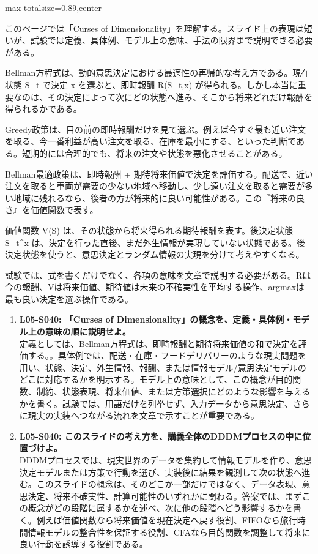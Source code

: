 \begin{minipage}[t]{0.58\textwidth}
\begin{adjustbox}{max totalsize={\textwidth}{0.89\textheight},center}
\begin{minipage}{\textwidth}\scriptsize
{}このページでは「Curses of Dimensionality」を理解する。スライド上の表現は短いが、試験では定義、具体例、モデル上の意味、手法の限界まで説明できる必要がある。\par
Bellman方程式は、動的意思決定における最適性の再帰的な考え方である。現在状態 S\_t で決定 x を選ぶと、即時報酬 R(S\_t,x) が得られる。しかし本当に重要なのは、その決定によって次にどの状態へ進み、そこから将来どれだけ報酬を得られるかである。\par
Greedy政策は、目の前の即時報酬だけを見て選ぶ。例えば今すぐ最も近い注文を取る、今一番利益が高い注文を取る、在庫を最小にする、といった判断である。短期的には合理的でも、将来の注文や状態を悪化させることがある。\par
Bellman最適政策は、即時報酬 + 期待将来価値で決定を評価する。配送で、近い注文を取ると車両が需要の少ない地域へ移動し、少し遠い注文を取ると需要が多い地域に残れるなら、後者の方が将来的に良い可能性がある。この『将来の良さ』を価値関数で表す。\par
価値関数 V(S) は、その状態から将来得られる期待報酬を表す。後決定状態 S\_t\textasciicircum{}x は、決定を行った直後、まだ外生情報が実現していない状態である。後決定状態を使うと、意思決定とランダム情報の実現を分けて考えやすくなる。\par
試験では、式を書くだけでなく、各項の意味を文章で説明する必要がある。Rは今の報酬、Vは将来価値、期待値は未来の不確実性を平均する操作、argmaxは最も良い決定を選ぶ操作である。\par{}\begin{enumerate}\item \textbf{L05-S040: 「Curses of Dimensionality」の概念を、定義・具体例・モデル上の意味の順に説明せよ。}\\定義としては、Bellman方程式は、即時報酬と期待将来価値の和で決定を評価する。。具体例では、配送・在庫・フードデリバリーのような現実問題を用い、状態、決定、外生情報、報酬、または情報モデル/意思決定モデルのどこに対応するかを明示する。モデル上の意味として、この概念が目的関数、制約、状態表現、将来価値、または方策選択にどのような影響を与えるかを書く。試験では、用語だけを列挙せず、入力データから意思決定、さらに現実の実装へつながる流れを文章で示すことが重要である。\item \textbf{L05-S040: このスライドの考え方を、講義全体のDDDMプロセスの中に位置づけよ。}\\DDDMプロセスでは、現実世界のデータを集約して情報モデルを作り、意思決定モデルまたは方策で行動を選び、実装後に結果を観測して次の状態へ進む。このスライドの概念は、そのどこか一部だけではなく、データ表現、意思決定、将来不確実性、計算可能性のいずれかに関わる。答案では、まずこの概念がどの段階に属するかを述べ、次に他の段階へどう影響するかを書く。例えば価値関数なら将来価値を現在決定へ戻す役割、FIFOなら旅行時間情報モデルの整合性を保証する役割、CFAなら目的関数を調整して将来に良い行動を誘導する役割である。\end{enumerate}

\end{minipage}
\end{adjustbox}
\end{minipage}
